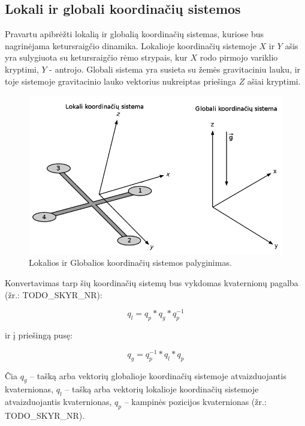 \documentclass[12pt, a4paper, lithuanian, final]{article}
\begin{document}
\subsection{Lokali ir globali koordinačių sistemos}
Pravartu apibrėžti lokalią ir globalią koordinačių sistemas, kuriose bus nagrinėjama ketursraigčio dinamika.
Lokalioje koordinačių sistemoje $X$ ir $Y$ ašis yra sulygiuota su ketursraigčio rėmo strypais, kur $X$ rodo pirmojo variklio kryptimi, $Y$ - antrojo.
Globali sistema yra susieta su žemės gravitaciniu lauku, ir toje sistemoje gravitacinio lauko vektorius nukreiptas priešinga $Z$ ašiai kryptimi.

\begin{figure}[H]
\begin{center}
\includegraphics[width=1.0\textwidth]{img/Quadcopter_Coordinates.png}
\caption{Lokalios ir Globalios koordinačių sistemos palyginimas.}
\end{center}
\end{figure}


Konvertavimas tarp šių koordinačių sistemų bus vykdomas kvaternionų pagalba (žr.: TODO\_SKYR\_NR):

\begin{equation}
	q_{l} = q_{p} * q_{g} * q_{p}^{-1}
\end{equation}

ir į priešingą pusę:

\begin{equation}
	q_{g} = q_{p}^{-1} * q_{l} * q_{p}
\end{equation}

Čia $q_{g}$ -- tašką arba vektorių globalioje koordinačių sistemoje atvaizduojantis kvaternionas, $q_{l}$ -- tašką arba vektorių lokalioje koordinačių sistemoje atvaizduojantis kvaternionas, $q_{p}$ -- kampinės pozicijos kvaternionas (žr.: TODO\_SKYR\_NR).
\end{document}
